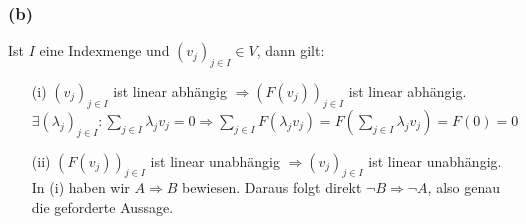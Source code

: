 \documentclass[12pt]{article}
\begin{document}
\subsubsection*{(b)}Ist $I$ eine Indexmenge und $(v_j)_{j{\in}I}{\in}V$, dann gilt:
\begin{itemize}
\item[(i)]$(v_j)_{j{\in}I}$ ist linear abh{\"a}ngig $\Rightarrow (F(v_j))_{j{\in}I}$ ist linear abh{\"a}ngig.\\
$\exists (\lambda_j)_{j{\in}I}: \sum_{j{\in}I}\lambda_jv_j=0 \Rightarrow \sum_{j{\in}I}F(\lambda_jv_j)=F(\sum_{j{\in}I}\lambda_jv_j) = F(0)=0$
\item[(ii)]$(F(v_j))_{j{\in}I}$ ist linear unabh{\"a}ngig $\Rightarrow (v_j)_{j{\in}I}$ ist linear unabh{\"a}ngig.\\
In (i) haben wir $A \Rightarrow B$ bewiesen. Daraus folgt direkt $\neg B \Rightarrow \neg A$, also genau die geforderte Aussage.
\end{itemize}
\end{document}
